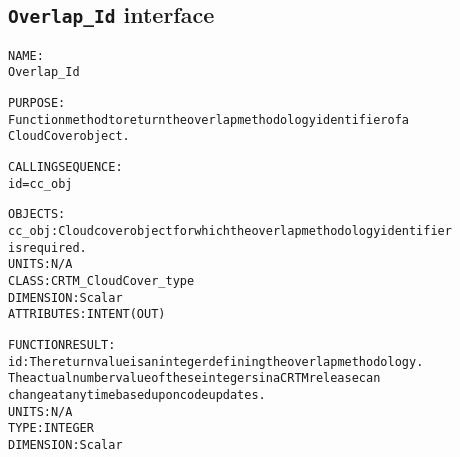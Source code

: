 \subsection{\texttt{Overlap\_Id} interface}
  \label{sec:Overlap_Id_interface}
  \begin{alltt}
 
  NAME:
    Overlap_Id
 
  PURPOSE:
    Function method to return the overlap methodology identifier of a
    CloudCover object.
 
  CALLING SEQUENCE:
    id = cc_obj%Overlap_Id()
 
  OBJECTS:
    cc_obj:  Cloud cover object for which the overlap methodology identifier
             is required.
             UNITS:      N/A
             CLASS:      CRTM_CloudCover_type
             DIMENSION:  Scalar
             ATTRIBUTES: INTENT(OUT)
 
  FUNCTION RESULT:
    id:      The return value is an integer defining the overlap methodology.
             The actual number value of these integers in a CRTM release can
             change at any time based upon code updates.
             UNITS:      N/A
             TYPE:       INTEGER
             DIMENSION:  Scalar
 
  \end{alltt}
